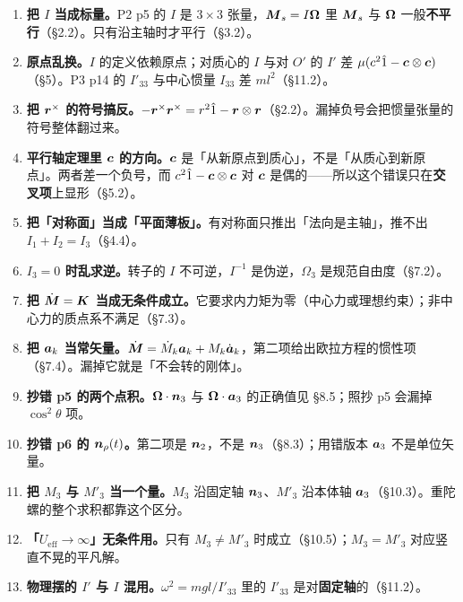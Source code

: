 \documentclass[11pt]{ctexart}
\begin{document}
\begin{enumerate}
\item \textbf{把 $I$ 当成标量。}P2 p5 的 $I$ 是 $3\times3$ 张量，$\boldsymbol{M}_s=I\boldsymbol{\Omega}$ 里 $\boldsymbol{M}_s$ 与 $\boldsymbol{\Omega}$ 一般\textbf{不平行}（\S2.2）。只有沿主轴时才平行（\S3.2）。
\item \textbf{原点乱换。}$I$ 的定义依赖原点；对质心的 $I$ 与对 $O'$ 的 $I'$ 差 $\mu(c^2\hat1-\boldsymbol{c}\otimes\boldsymbol{c})$（\S5）。P3 p14 的 $I'_{33}$ 与中心惯量 $I_{33}$ 差 $ml^2$（\S11.2）。
\item \textbf{把 $\boldsymbol{r}^\times$ 的符号搞反。}$-\boldsymbol{r}^\times\boldsymbol{r}^\times=r^2\hat1-\boldsymbol{r}\otimes\boldsymbol{r}$（\S2.2）。漏掉负号会把惯量张量的符号整体翻过来。
\item \textbf{平行轴定理里 $\boldsymbol{c}$ 的方向。}$\boldsymbol{c}$ 是「从新原点到质心」，不是「从质心到新原点」。两者差一个负号，而 $c^2\hat1-\boldsymbol{c}\otimes\boldsymbol{c}$ 对 $\boldsymbol{c}$ 是偶的——所以这个错误只在\textbf{交叉项}上显形（\S5.2）。
\item \textbf{把「对称面」当成「平面薄板」。}有对称面只推出「法向是主轴」，推不出 $I_1+I_2=I_3$（\S4.4）。
\item \textbf{$I_3=0$ 时乱求逆。}转子的 $I$ 不可逆，$I^{-1}$ 是伪逆，$\Omega_3$ 是规范自由度（\S7.2）。
\item \textbf{把 $\dot{\boldsymbol{M}}=\boldsymbol{K}$ 当成无条件成立。}它要求内力矩为零（中心力或理想约束）；非中心力的质点系不满足（\S7.3）。
\item \textbf{把 $\boldsymbol{a}_k$ 当常矢量。}$\dot{\boldsymbol{M}}=\dot M_k\boldsymbol{a}_k+M_k\dot{\boldsymbol{a}}_k$，第二项给出欧拉方程的惯性项（\S7.4）。漏掉它就是「不会转的刚体」。
\item \textbf{抄错 p5 的两个点积。}$\boldsymbol{\Omega}\cdot\boldsymbol{n}_3$ 与 $\boldsymbol{\Omega}\cdot\boldsymbol{a}_3$ 的正确值见 \S8.5；照抄 p5 会漏掉 $\cos^2\theta$ 项。
\item \textbf{抄错 p6 的 $\boldsymbol{n}_\rho(t)$。}第二项是 $\boldsymbol{n}_2$，不是 $\boldsymbol{n}_3$（\S8.3）；用错版本 $\boldsymbol{a}_3$ 不是单位矢量。
\item \textbf{把 $M_3$ 与 $M'_3$ 当一个量。}$M_3$ 沿固定轴 $\boldsymbol{n}_3$、$M'_3$ 沿本体轴 $\boldsymbol{a}_3$（\S10.3）。重陀螺的整个求积都靠这个区分。
\item \textbf{「$U_{\text{eff}}\to\infty$」无条件用。}只有 $M_3\neq M'_3$ 时成立（\S10.5）；$M_3=M'_3$ 对应竖直不晃的平凡解。
\item \textbf{物理摆的 $I'$ 与 $I$ 混用。}$\omega^2=mgl/I'_{33}$ 里的 $I'_{33}$ 是对\textbf{固定轴}的（\S11.2）。
\end{enumerate}

\end{document}
